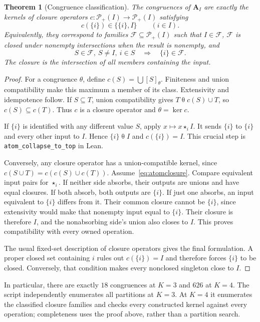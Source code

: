 \documentclass[11pt]{article}
\newtheorem{theorem}{Theorem}[section]
\newcommand{\A}{\mathbf A_I}
\newcommand{\Pow}{\mathcal P_+}
\newcommand{\ow}[1]{\mathbin{\star_{#1}}}
\begin{document}
\begin{theorem}[Congruence classification]\label{thm:congruences}
The congruences of $\A$ are exactly the kernels of closure operators
$c:\Pow(I)\to\Pow(I)$ satisfying
\begin{equation}\label{eq:atomclosure}
 c(\{i\})\in\{\{i\},I\}\qquad(i\in I).
\end{equation}
Equivalently, they correspond to families $\mathcal F\subseteq\Pow(I)$
such that $I\in\mathcal F$, $\mathcal F$ is closed under nonempty
intersections when the result is nonempty, and
\[
 S\in\mathcal F,\ S\ne I,\ i\in S\quad\Longrightarrow\quad
 \{i\}\in\mathcal F.
\]
The closure is the intersection of all members containing the input.
\end{theorem}
\begin{proof}
For a congruence $\theta$, define
$c(S)=\bigcup[S]_\theta$. Finiteness and union compatibility make this
maximum a member of its class. Extensivity and idempotence follow.
If $S\subseteq T$, union compatibility gives
$T\mathrel\theta c(S)\cup T$, so $c(S)\subseteq c(T)$. Thus $c$ is a
closure operator and $\theta=\ker c$.

If $\{i\}$ is identified with any different value $S$, apply
$x\mapsto x\ow i I$. It sends $\{i\}$ to $\{i\}$ and every other input
to $I$. Hence $\{i\}\mathrel\theta I$ and $c(\{i\})=I$.
This crucial step is \texttt{atom\_collapse\_to\_top} in Lean.

Conversely, any closure operator has a union-compatible kernel, since
$c(S\cup T)=c(c(S)\cup c(T))$. Assume~\eqref{eq:atomclosure}. Compare
equivalent input pairs for $\star_i$. If neither side absorbs, their
outputs are unions and have equal closures. If both absorb, both outputs
are $\{i\}$. If just one absorbs, an input equivalent to $\{i\}$ differs
from it. Their common closure cannot be $\{i\}$, since extensivity would
make that nonempty input equal to $\{i\}$. Their closure is therefore
$I$, and the nonabsorbing side's union also closes to $I$. This proves compatibility
with every owned operation.

The usual fixed-set description of closure operators gives the final
formulation. A proper closed set containing $i$ rules out
$c(\{i\})=I$ and therefore forces $\{i\}$ to be closed. Conversely, that
condition makes every nonclosed singleton close to $I$.
\end{proof}

In particular, there are exactly $18$ congruences at $K=3$ and $626$ at
$K=4$. The script independently enumerates all partitions at $K=3$.
At $K=4$ it enumerates the classified closure families and checks every
constructed kernel against every operation; completeness uses the proof
above, rather than a partition search.
\end{document}
